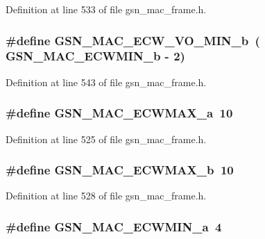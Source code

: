 Definition at line 533 of file gsn\_\-mac\_\-frame.h.

\hypertarget{a00523_abf045ff51b78cbceaecf7ea9ca9809e6}{
\subsubsection[{GSN\_\-MAC\_\-ECW\_\-VO\_\-MIN\_\-b}]{\setlength{\rightskip}{0pt plus 5cm}\#define GSN\_\-MAC\_\-ECW\_\-VO\_\-MIN\_\-b~( GSN\_\-MAC\_\-ECWMIN\_\-b -\/ 2)}}
\label{a00523_abf045ff51b78cbceaecf7ea9ca9809e6}


Definition at line 543 of file gsn\_\-mac\_\-frame.h.

\hypertarget{a00523_a32d686ffde6f4e70e74f8140cc8924c2}{
\subsubsection[{GSN\_\-MAC\_\-ECWMAX\_\-a}]{\setlength{\rightskip}{0pt plus 5cm}\#define GSN\_\-MAC\_\-ECWMAX\_\-a~10}}
\label{a00523_a32d686ffde6f4e70e74f8140cc8924c2}


Definition at line 525 of file gsn\_\-mac\_\-frame.h.

\hypertarget{a00523_a91964a102ed95613ab71d8a3cd80337f}{
\subsubsection[{GSN\_\-MAC\_\-ECWMAX\_\-b}]{\setlength{\rightskip}{0pt plus 5cm}\#define GSN\_\-MAC\_\-ECWMAX\_\-b~10}}
\label{a00523_a91964a102ed95613ab71d8a3cd80337f}


Definition at line 528 of file gsn\_\-mac\_\-frame.h.

\hypertarget{a00523_a822a28c535999f8d55e1606d143f94c3}{
\subsubsection[{GSN\_\-MAC\_\-ECWMIN\_\-a}]{\setlength{\rightskip}{0pt plus 5cm}\#define GSN\_\-MAC\_\-ECWMIN\_\-a~4}}
\label{a00523_a822a28c535999f8d55e1606d143f94c3}


